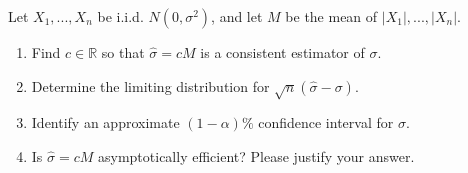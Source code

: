 \begin{exercise}\label{probability:2014:9}
Let $X_1, ..., X_n$ be i.i.d. $N(0, \sigma^2)$, and let $M$ be the mean of $|X_1|, ..., |X_n|$.

\begin{enumerate}
    \item Find $c \in \mathbb{R}$ so that $\hat{\sigma} = cM$ is a consistent estimator of $\sigma$.
    \item Determine the limiting distribution for $\sqrt{n}(\hat{\sigma} - \sigma)$.
    \item Identify an approximate $(1-\alpha)\%$ confidence interval for $\sigma$.
    \item Is $\hat{\sigma} = cM$ asymptotically efficient? Please justify your answer.
\end{enumerate}
\end{exercise}

